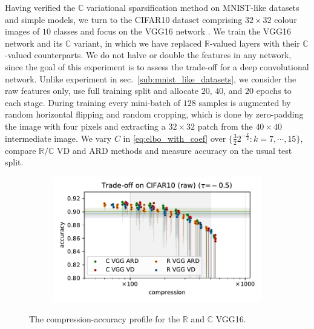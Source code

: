 \documentclass[a4paper,10pt,twocolumn]{article}
\newcommand{\real}{\mathbb{R}}
\newcommand{\cplx}{\mathbb{C}}
\begin{document}
Having verified the $\cplx$ variational sparsification method on MNIST-like datasets
and simple models, we turn to the CIFAR10 dataset comprising $32\times 32$ colour
images of $10$ classes \citep{krizhevsky_learning_2009} and focus on the VGG16 network
\citep{simonyan_very_2015}.
%
We train the VGG16 network and its $\cplx$ variant, in which we have replaced $\real$-valued
layers with their $\cplx$-valued counterparts. We do not halve or double the features
in any network, since the goal of this experiment is to assess the trade-off for a deep
convolutional network.
%
Unlike experiment in sec.~\ref{sub:mnist_like_datasets}, we consider the raw features
only, use full training split and allocate $20$, $40$, and $20$ epochs to each stage.
During training every mini-batch of $128$ samples is augmented by random horizontal flipping
and random cropping, which is done by zero-padding the image with four pixels and extracting
a $32\times 32$ patch from the $40\times 40$ intermediate image.
%
We vary $C$ in \eqref{eq:elbo_with_coef} over $
  \{\tfrac32 2^{-\tfrac{k}2} \colon k=7, \cdots, 15\}
$, compare $\real / \cplx$ VD and ARD methods and measure accuracy on the usual test split.

\begin{figure}[!t]
  \centering
  \begin{subfigure}[b]{1.\columnwidth}  %
    \includegraphics[width=\columnwidth]{figure__cifar__trade-off/appendix__augmentedcifar10__raw__-0.5.pdf}
  \end{subfigure}
  \caption{%
    The compression-accuracy profile for the $\real$ and $\cplx$ VGG16.
  }
  \label{fig:figure__cifar10__trade-off}
\end{figure}
\end{document}
